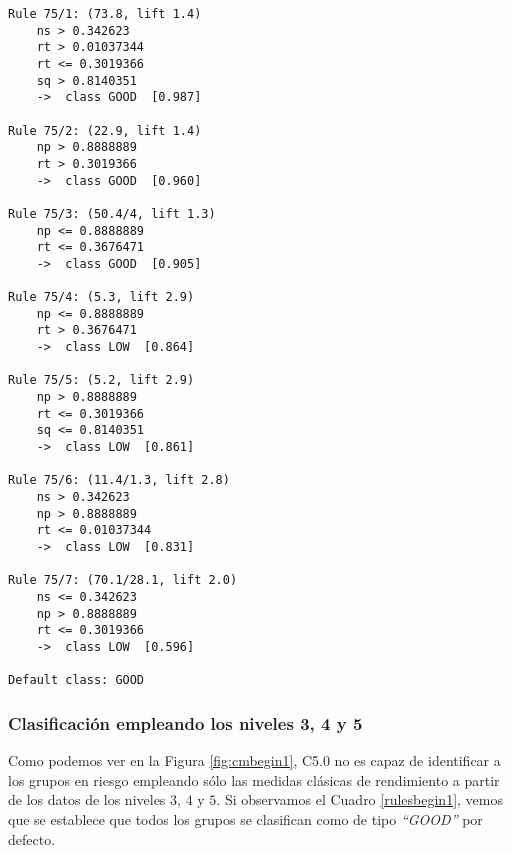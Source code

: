 \begin{tcolorbox}[title=Reglas de clasificación para identificar grupos de tipo \emph{``LOW''}.]
  \makeatletter
  \makeatother
\begin{multicols}{2}
    \begin{verbatim}
Rule 75/1: (73.8, lift 1.4)
	ns > 0.342623
	rt > 0.01037344
	rt <= 0.3019366
	sq > 0.8140351
	->  class GOOD  [0.987]

Rule 75/2: (22.9, lift 1.4)
	np > 0.8888889
	rt > 0.3019366
	->  class GOOD  [0.960]

Rule 75/3: (50.4/4, lift 1.3)
	np <= 0.8888889
	rt <= 0.3676471
	->  class GOOD  [0.905]

Rule 75/4: (5.3, lift 2.9)
	np <= 0.8888889
	rt > 0.3676471
	->  class LOW  [0.864]

Rule 75/5: (5.2, lift 2.9)
	np > 0.8888889
	rt <= 0.3019366
	sq <= 0.8140351
	->  class LOW  [0.861]

Rule 75/6: (11.4/1.3, lift 2.8)
	ns > 0.342623
	np > 0.8888889
	rt <= 0.01037344
	->  class LOW  [0.831]

Rule 75/7: (70.1/28.1, lift 2.0)
	ns <= 0.342623
	np > 0.8888889
	rt <= 0.3019366
	->  class LOW  [0.596]
	
Default class: GOOD
    \end{verbatim}
  \end{multicols}
\label{rulesend1}
\end{tcolorbox}

\subsubsection{Clasificación empleando los niveles 3, 4 y 5}

Como podemos ver en la Figura \ref{fig:cmbegin1}, C5.0 no es capaz de identificar a los grupos en riesgo empleando sólo las medidas clásicas de rendimiento a partir de los datos de los niveles $3$, $4$ y $5$. Si observamos el Cuadro \ref{rulesbegin1}, vemos que se establece que todos los grupos se clasifican como de tipo \emph{``GOOD''} por defecto.

